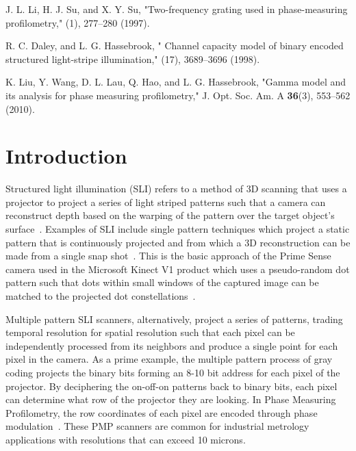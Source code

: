 \documentclass[10pt]{article}
\begin{document}
\begin{thebibliography}{99}
  J. L. Li, H. J. Su,  and  X. Y. Su,  "Two-frequency grating used in phase-measuring profilometry," (1), 277--280 (1997).

  R. C. Daley, and L. G. Hassebrook,  " Channel capacity model of binary encoded structured light-stripe illumination," (17), 3689--3696 (1998).

  K. Liu, Y. Wang, D. L. Lau, Q. Hao, and L. G. Hassebrook,  "Gamma model and its analysis for phase measuring profilometry," J. Opt. Soc. Am. A {\bfseries 36}(3), 553--562 (2010).



% 
% 

\end{thebibliography}

% 
% 

\section{Introduction}
Structured light illumination (SLI) refers to a method of 3D scanning that uses a projector to project a series of light striped patterns such that a camera can reconstruct depth based on the warping of the pattern over the target object's surface~\cite{morano1998structured,geng2011structured,gupta2013structured,gupta2012micro,liu2010dual,gupta2011structured,rosman2016information,o20143d}.  Examples of SLI include single pattern techniques which project a static pattern that is continuously projected and from which a 3D reconstruction can be made from a single snap shot~\cite{geng2011structured,boyer1987color,geng1996rainbow, freedman2012depth}.  This is the basic approach of the Prime Sense camera used in the Microsoft Kinect V1 product which uses a pseudo-random dot pattern such that dots within small windows of the captured image can be matched to the projected dot constellations~\cite{ryan2016hyperdepth,freedman2012depth,martinez2013kinect}. 

Multiple pattern SLI scanners, alternatively, project a series of patterns, trading temporal resolution for spatial resolution such that each pixel can be independently processed from its neighbors and produce a single point for each pixel in the camera.  As a prime example, the multiple pattern process of gray coding projects the binary bits forming an 8-10 bit address for each pixel of the projector. By deciphering the on-off-on patterns back to binary bits, each pixel can determine what row of the projector they are looking. In Phase Measuring Profilometry, the row coordinates of each pixel are encoded through phase modulation~\cite{srinivasan1984automated,liu2010dual,geng2011structured,chen2008modulated}. These PMP scanners are common for industrial metrology applications with resolutions that can exceed 10 microns.
\end{document}
